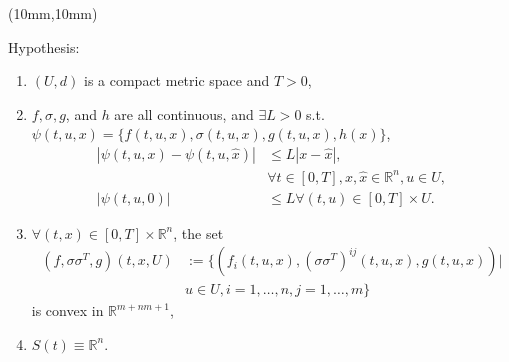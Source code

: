 \begin{frame}[plain]
    \begin{textblock*}{110mm}(10mm,10mm)
        \begin{graybox}{Hypothesis:}
            \begin{enumerate}[(\textbf{{SE}}-1)]
                \item<1->
                    $(U,d)$ is a compact metric space and $T>0$,
                \item<2->
                    $f,\sigma,g$, and $h$ are all continuous, and 
                    $\exists L>0$ 
                    s.t.
                    $
                        \psi(t,u,x)=
                            \{f(t,u,x),
                                \sigma(t,u,x),
                                g(t,u,x),
                                h(x)
                            \}
                   $, 
                    \begin{align*}
                        |\psi(t,u,x)-\psi(t,u,\hat{x})|
                            &
                                \leq L|x-\hat{x}|,
                        \\
                            &
                                \forall t
                                \in [0,T], x,
                                \hat{x}
                                \in 
                                \mathbb{R}^n,u \in U,
                        \\
                        |\psi(t,u,0)|
                            &\leq 
                                L \forall (t,u)
                                \in[0,T] \times U.
                    \end{align*}  
                \item<3->
                    $\forall (t,x)\in [0,T]\times \mathbb{R}^n$, the set
                    \begin{align*}
                        (f,\sigma\sigma^T,g)(t,x,U)&:=
                            \{(
                                f_i(t,u,x),
                                (\sigma\sigma^T)^{ij}(t,u,x),g(t,u,x))|
                        \\
                        &
                        u\in U,i=1,\ldots,n,j=1,\ldots,m\}
                    \end{align*}
                    is convex in $\mathbb{R}^{m+nm+1}$,
                \item<4->
                $S(t)\equiv\mathbb{R}^n$.
            \end{enumerate}
        \end{graybox}
    \end{textblock*}
\end{frame}
